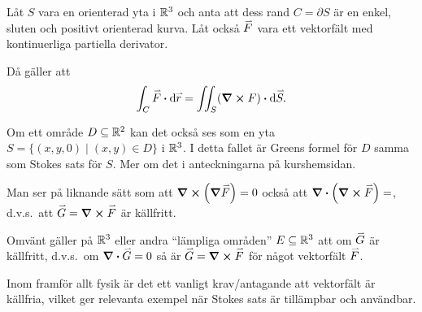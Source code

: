 \documentclass[a4paper]{article}
\begin{document}
\begin{sats}
    Låt \(
        S
    \) vara en orienterad yta i \(
        \mathbb{R}^3
    \) och anta att dess rand \(
        C = \partial S
    \) är en enkel, sluten och positivt orienterad kurva. Låt också \(
        \accentset{\rightharpoonup}{F}
    \) vara ett vektorfält med kontinuerliga partiella derivator. 
    
    Då gäller att \[
        \int_C \vef \sprod \dd \ver = \iint_S (\curl{F}) \sprod \dd \ve{S}.
    \] 
\end{sats}

Om ett område \(
    D \subseteq \mathbb{R}^2
\) kan det också ses som en yta \(
    S = \{ (x,y,0) \; | \; (x,y) \in D \}
\) i \(
    \mathbb{R}^3
\). I detta fallet är Greens formel för \(
    D
\) samma som Stokes sats för \(
    S
\). Mer om det i anteckningarna på kurshemsidan. 

\begin{anm}
    Man ser på liknande sätt som att \(
        \curl(\grad{\accentset{\rightharpoonup}{F}}) = 0
    \) också att \(
        \div(\curl{\accentset{\rightharpoonup}{F}}) = 
    \), d.v.s.\ att \(
        \accentset{\rightharpoonup}{G} = \curl{\accentset{\rightharpoonup}{F}}
    \) är källfritt.

    Omvänt gäller på \(
        \mathbb{R}^3
    \) eller andra \enquote{lämpliga områden} \(
        E \subseteq \mathbb{R}^3
    \) att om \(
        \accentset{\rightharpoonup}{G}
    \) är källfritt, d.v.s.\ om \(
        \div{\accentset{\rightharpoonup}{G}} = 0
    \) så är \(
        \accentset{\rightharpoonup}{G} = \curl{\accentset{\rightharpoonup}{F}}
    \) för något vektorfält \(
        \accentset{\rightharpoonup}{F}
    \). 
    
    Inom framför allt fysik är det ett vanligt krav/antagande att  
    vektorfält är källfria, vilket ger relevanta exempel när Stokes sats
    är tillämpbar och användbar. 
\end{anm}
\end{document}
